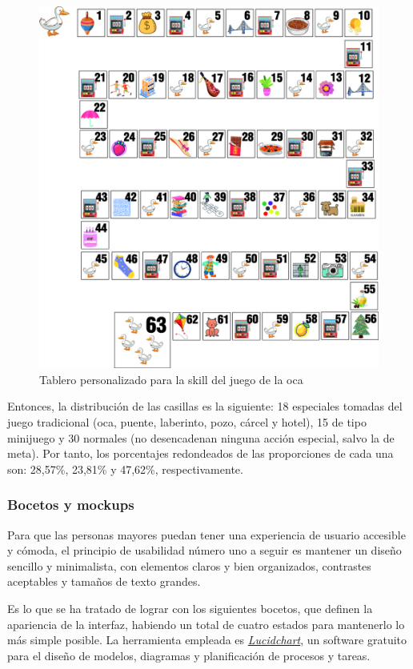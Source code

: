 \begin{figure}[H]
	\centering
	\includegraphics[width=1\textwidth]{imgs/tablero-oca.jpg}
	\caption{Tablero personalizado para la skill del juego de la oca}
	\label{fig:tablero-oca}
\end{figure}
 
Entonces, la distribución de las casillas es la siguiente: 18 especiales tomadas del juego tradicional (oca, puente, laberinto, pozo, cárcel y hotel), 15 de tipo minijuego y 30 normales (no desencadenan ninguna acción especial, salvo la de meta). Por tanto, los porcentajes redondeados de las proporciones de cada una son: 28,57\%, 23,81\% y 47,62\%, respectivamente. 

\subsubsection{Bocetos y mockups}

Para que las personas mayores puedan tener una experiencia de usuario accesible y cómoda, el principio de usabilidad número uno a seguir es mantener un diseño sencillo y minimalista, con elementos claros y bien organizados, contrastes aceptables y tamaños de texto grandes. 

Es lo que se ha tratado de lograr con los siguientes bocetos, que definen la apariencia de la interfaz, habiendo un total de cuatro estados para mantenerlo lo más simple posible. La herramienta empleada es \href{https://www.lucidchart.com/pages/es}{\textit{Lucidchart}}, un software gratuito para el diseño de modelos, diagramas y planificación de procesos y tareas.

